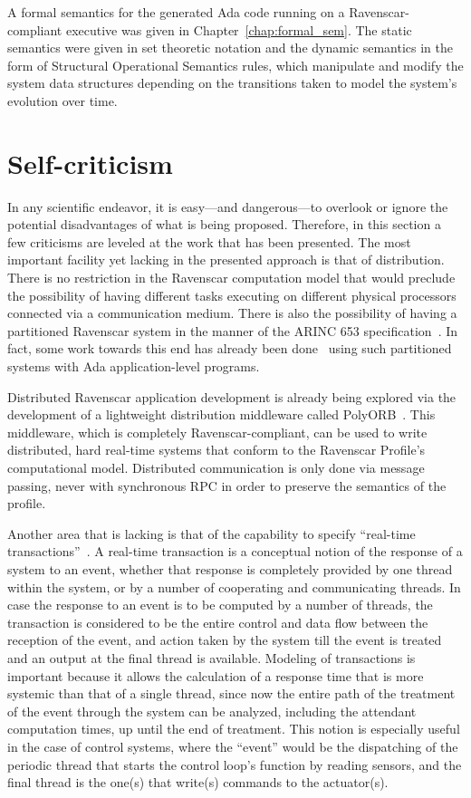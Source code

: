 A formal semantics for the generated Ada code running on a
Ravenscar-compliant executive was given in
Chapter~\ref{chap:formal_sem}. The static semantics were given in set
theoretic notation and the dynamic semantics in the form of Structural
Operational Semantics rules, which manipulate and modify the system
data structures depending on the transitions taken to model the
system's evolution over time.

\section{Self-criticism}
In any scientific endeavor, it is easy---and dangerous---to overlook
or ignore the potential disadvantages of what is being
proposed. Therefore, in this section a few criticisms are leveled at
the work that has been presented. The most important facility yet
lacking in the presented approach is that of distribution. There is no
restriction in the Ravenscar computation model that would preclude the
possibility of having different tasks executing on different physical
processors connected via a communication medium. There is also the
possibility of having a partitioned Ravenscar system in the manner of
the ARINC 653 specification~\cite{arinc}. In fact, some work towards
this end has already been done~\cite{tokar@adalett03} using such
partitioned systems with Ada application-level programs.

Distributed Ravenscar application development is already being
explored via the development of a lightweight distribution middleware
called PolyORB~\cite{zalila@ae07}. This middleware, which is
completely Ravenscar-compliant, can be used to write distributed, hard
real-time systems that conform to the Ravenscar Profile's
computational model. Distributed communication is only done via
message passing, never with synchronous RPC in order to preserve the
semantics of the profile.

Another area that is lacking is that of the capability to specify
``real-time transactions''~\cite{cornwell@ae96}. A real-time
transaction is a conceptual notion of the response of a system to an
event, whether that response is completely provided by one thread
within the system, or by a number of cooperating and communicating
threads. In case the response to an event is to be computed by a
number of threads, the transaction is considered to be the entire
control and data flow between the reception of the event, and action
taken by the system till the event is treated and an output at the
final thread is available. Modeling of transactions is important
because it allows the calculation of a response time that is more
systemic than that of a single thread, since now the entire path of
the treatment of the event through the system can be analyzed,
including the attendant computation times, up until the end of
treatment. This notion is especially useful in the case of control
systems, where the ``event'' would be the dispatching of the periodic
thread that starts the control loop's function by reading sensors, and
the final thread is the one(s) that write(s) commands to the
actuator(s).

